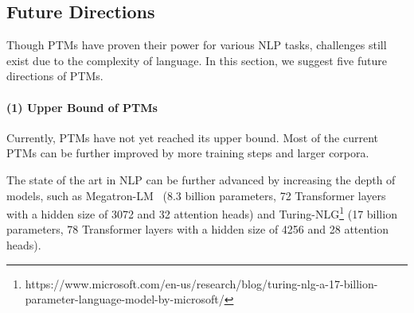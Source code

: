 \documentclass[fleqn]{SCYE-arxiv}
\begin{document}
\begin{multicols}{2}
%


\section{Future Directions}
\label{sec:future}

Though PTMs have proven their power for various NLP tasks, challenges still exist due to the complexity of language. In this section, we suggest five future directions of PTMs.

\paragraph{(1) Upper Bound of PTMs}
Currently, PTMs have not yet reached its upper bound. Most of the current PTMs can be further improved by more training steps and larger corpora.

The state of the art in NLP can be further advanced by increasing the depth of models, such as Megatron-LM~\cite{shoeybi2019megatron} (8.3 billion parameters, 72 Transformer layers with a hidden size of 3072 and 32 attention heads) and Turing-NLG\footnote{https://www.microsoft.com/en-us/research/blog/turing-nlg-a-17-billion-parameter-language-model-by-microsoft/} (17 billion parameters, 78 Transformer layers with a hidden size of 4256 and 28 attention heads).


\end{multicols}
\end{document}
